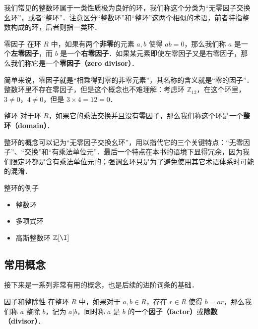 


我们常见的整数环属于一类性质极为良好的环，我们称这个分类为“无零因子交换幺环”，或者“整环”．注意区分“整数环”和“整环”这两个相似的术语，前者特指整数构成的环，后者则指一类环．

\begin{definition}{零因子}
在环 $R$ 中，如果有两个\textbf{非零}的元素 $a, b$ 使得 $ab=0$，那么我们称 $a$ 是一个\textbf{左零因子}，而 $b$ 是一个\textbf{右零因子}．如果某元素即使左零因子又是右零因子，那么我们称它是一个\textbf{零因子（zero divisor）}．
\end{definition}

简单来说，零因子就是“相乘得到零的非零元素”，其名称的含义就是“零的因子”．整数环里不存在零因子，但是这个概念也不难理解：考虑环 $\mathbb{Z}_{12}$，在这个环里，$3\not=0$，$4\not=0$，但是 $3\times 4=12=0$．

\begin{definition}{整环}
对于环 $R$，如果它的乘法交换并且没有零因子，那么我们称这个环是一个\textbf{整环（domain）}．
\end{definition}

整环的概念可以记为“无零因子交换幺环”，用以指代它的三个关键特点：“无零因子”、“交换”和“有乘法单位元”．最后一个特点在本书的语境下显得冗余，因为我们限定环都是含有乘法单位元的；强调幺环只是为了避免使用其它术语体系时可能的混淆．

\begin{example}{整环的例子}
\begin{itemize}
\item 整数环
\item 多项式环
\item 高斯整数环 $\mathbb{Z}[\I]$
\end{itemize}

\end{example}

\subsection{常用概念}

接下来是一系列非常有用的概念，也是后续的进阶词条的基础．

\begin{definition}{因子和整除性}
在整环 $R$ 中，如果对于 $a, b\in R$，存在 $r\in R$ 使得 $b=ar$，那么我们称 $a$ 整除 $b$，记为 $a|b$，同时称 $a$ 是 $b$ 的一个\textbf{因子（factor）}或\textbf{除数（divisor）}．
\end{definition}

